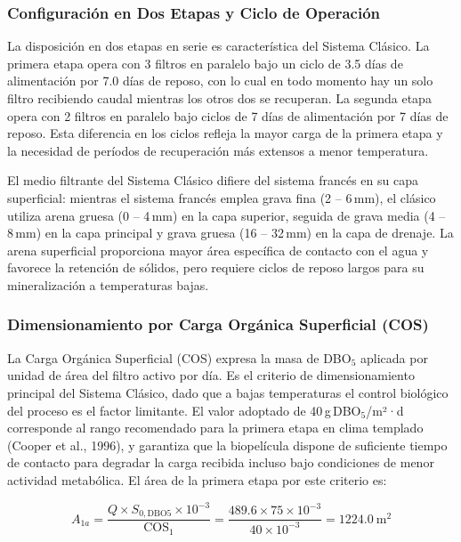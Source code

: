 \documentclass[12pt,a4paper]{article}
\begin{document}
\subsubsection*{Configuración en Dos Etapas y Ciclo de Operación}

La disposición en dos etapas en serie es característica del Sistema Clásico. La primera etapa opera con 3 filtros en paralelo bajo un ciclo de 3.5 días de alimentación por 7.0 días de reposo, con lo cual en todo momento hay un solo filtro recibiendo caudal mientras los otros dos se recuperan. La segunda etapa opera con 2 filtros en paralelo bajo ciclos de 7 días de alimentación por 7 días de reposo. Esta diferencia en los ciclos refleja la mayor carga de la primera etapa y la necesidad de períodos de recuperación más extensos a menor temperatura.

El medio filtrante del Sistema Clásico difiere del sistema francés en su capa superficial: mientras el sistema francés emplea grava fina (2 -- 6\,mm), el clásico utiliza arena gruesa (0 -- 4\,mm) en la capa superior, seguida de grava media (4 -- 8\,mm) en la capa principal y grava gruesa (16 -- 32\,mm) en la capa de drenaje. La arena superficial proporciona mayor área específica de contacto con el agua y favorece la retención de sólidos, pero requiere ciclos de reposo largos para su mineralización a temperaturas bajas.

\subsubsection*{Dimensionamiento por Carga Orgánica Superficial (COS)}

La Carga Orgánica Superficial (COS) expresa la masa de DBO$_5$ aplicada por unidad de área del filtro activo por día. Es el criterio de dimensionamiento principal del Sistema Clásico, dado que a bajas temperaturas el control biológico del proceso es el factor limitante. El valor adoptado de 40\,g\,DBO$_5$/m²·d corresponde al rango recomendado para la primera etapa en clima templado (Cooper et al., 1996), y garantiza que la biopelícula dispone de suficiente tiempo de contacto para degradar la carga recibida incluso bajo condiciones de menor actividad metabólica. El área de la primera etapa por este criterio es:

\begin{equation}
A_{1a} = \frac{Q \times S_{0,\text{DBO5}} \times 10^{-3}}{\text{COS}_1} = \frac{489.6 \times 75 \times 10^{-3}}{40 \times 10^{-3}} = 1224.0\ \text{m}^2
\end{equation}
\end{document}
